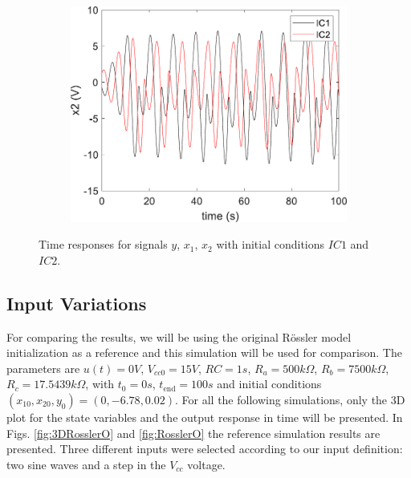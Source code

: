 \begin{figure}
\begin{subfigure}[b]{0.3\textwidth}
            \includegraphics[scale=0.35]{figs/x2vstValid.pdf}
        \end{subfigure}
        \caption{Time responses for signals $y$, $x_1$, $x_2$ with initial conditions $IC1$ and $IC2$.}
        \label{fig:validTime}
	\end{figure}
	\subsection{Input Variations}
	For comparing the results, we will be using the original R\"ossler model initialization \cite{rossler1976equation} as a reference and this simulation will be used for comparison. The parameters are $u(t)=0V$, $V_{cc0}=15V$, $RC=1s$, $R_a=500k\Omega$, $R_b=7500k\Omega$, $R_c=17.5439k\Omega$, with $t_0=0s$, $t_{\text{end}}=100s$ and initial conditions $(x_{10},x_{20},y_{0})=(0,-6.78,0.02)$. For all the following simulations, only the 3D plot for the state variables and the output response in time will be presented. In Figs. \ref{fig:3DRosslerO} and \ref{fig:RosslerO} the reference simulation results are presented. Three different inputs were selected according to our input definition: two sine waves and a step in the $V_{cc}$ voltage.
	

